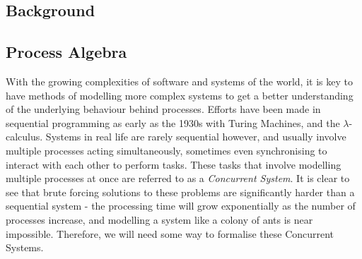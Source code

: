 \documentclass[logo,bsc,singlespacing,parskip,online]{infthesis}
\begin{document}
\begin{preliminary}
\maketitle
%
%
%
%
%
%
%
%
%
%
%
%
%
\chapter{Background}

\section{Process Algebra}
With the growing complexities of software and systems of the world, it is key to have methods of modelling more complex systems to get a better understanding of the underlying behaviour behind processes. Efforts have been made in sequential programming as early as the 1930s with Turing Machines, and the $\lambda$-calculus. Systems in real life are rarely sequential however, and usually involve multiple processes acting simultaneously, sometimes even synchronising to interact with each other to perform tasks. These tasks that involve modelling multiple processes at once are referred to as a \textit{Concurrent System}. It is clear to see that brute forcing solutions to these problems are significantly harder than a sequential system - the processing time will grow exponentially as the number of processes increase, and modelling a system like a colony of ants is near impossible. Therefore, we will need some way to formalise these Concurrent Systems.


\end{preliminary}
\end{document}

